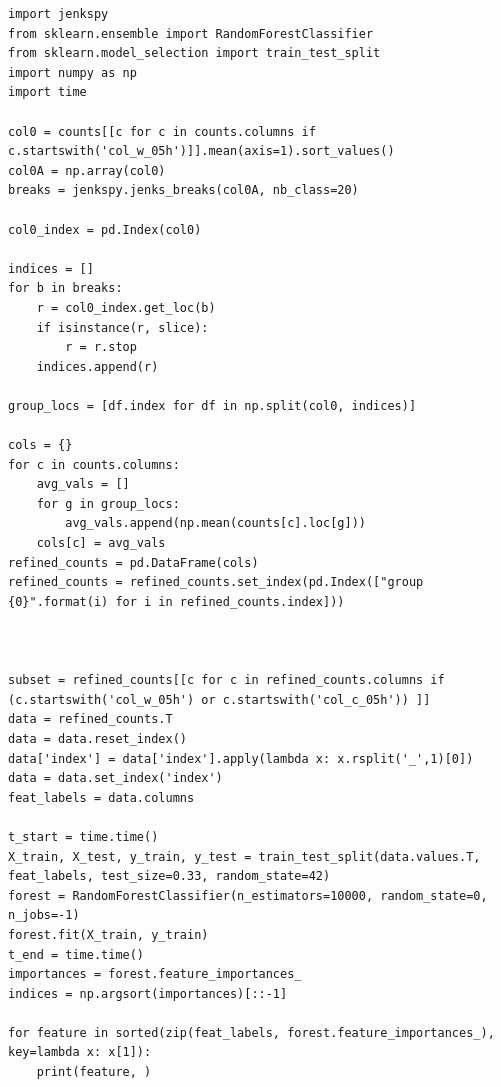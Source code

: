 \documentclass[11pt]{article}
\begin{document}
\begin{verbatim}
import jenkspy
from sklearn.ensemble import RandomForestClassifier
from sklearn.model_selection import train_test_split
import numpy as np
import time

col0 = counts[[c for c in counts.columns if c.startswith('col_w_05h')]].mean(axis=1).sort_values()
col0A = np.array(col0)
breaks = jenkspy.jenks_breaks(col0A, nb_class=20)

col0_index = pd.Index(col0)

indices = []
for b in breaks:
    r = col0_index.get_loc(b)
    if isinstance(r, slice):
        r = r.stop
    indices.append(r)

group_locs = [df.index for df in np.split(col0, indices)]

cols = {}
for c in counts.columns:
    avg_vals = []
    for g in group_locs:
        avg_vals.append(np.mean(counts[c].loc[g]))
    cols[c] = avg_vals
refined_counts = pd.DataFrame(cols)
refined_counts = refined_counts.set_index(pd.Index(["group {0}".format(i) for i in refined_counts.index]))



subset = refined_counts[[c for c in refined_counts.columns if (c.startswith('col_w_05h') or c.startswith('col_c_05h')) ]]
data = refined_counts.T
data = data.reset_index()
data['index'] = data['index'].apply(lambda x: x.rsplit('_',1)[0])
data = data.set_index('index')
feat_labels = data.columns

t_start = time.time()
X_train, X_test, y_train, y_test = train_test_split(data.values.T, feat_labels, test_size=0.33, random_state=42)
forest = RandomForestClassifier(n_estimators=10000, random_state=0, n_jobs=-1)
forest.fit(X_train, y_train)
t_end = time.time()
importances = forest.feature_importances_
indices = np.argsort(importances)[::-1]

for feature in sorted(zip(feat_labels, forest.feature_importances_), key=lambda x: x[1]):
    print(feature, )

\end{verbatim}
\end{document}

